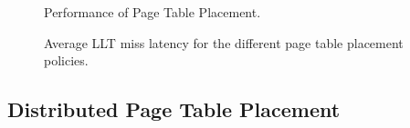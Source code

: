 \begin{figure}[t] 
  \vspace{-0. in} \centering
  \centerline{}

  \caption{\small Performance of Page Table Placement. \normalsize}
  \label{fig:perf_placement} 
  \vspace{0.2 in}
\end{figure}

\begin{figure}[t] 
  \vspace{0. in} \centering
  \centerline{}

  \caption{\small Average LLT miss latency for the different page table
    placement policies. \normalsize}

  \label{fig:tlblat_placement} 
  \vspace{-0.15 in}
\end{figure}

% 
% 

\subsection{Distributed Page Table Placement}





